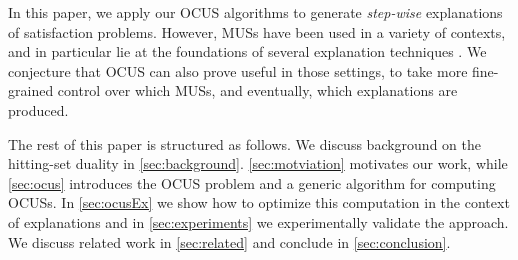 In this paper, we apply our OCUS algorithms to generate \emph{step-wise} explanations of satisfaction problems. However, MUSs have been used in a variety of contexts, and in particular lie at the foundations of several explanation techniques \cite{junker2001quickxplain,ignatiev2019abduction,schotten}. We conjecture that OCUS can also prove useful in those settings, to take more fine-grained control over which MUSs, and eventually, which explanations are produced.

The rest of this paper is structured as follows.
We discuss background on the hitting-set duality in \cref{sec:background}. \cref{sec:motviation} motivates our work, while \cref{sec:ocus} introduces the OCUS problem and a generic \hitsetbased algorithm for computing OCUSs. In \cref{sec:ocusEx} we show how to optimize this computation in the context of explanations and in  
\cref{sec:experiments}  we experimentally validate the approach.
We discuss related work in  \cref{sec:related} and conclude in \cref{sec:conclusion}.
